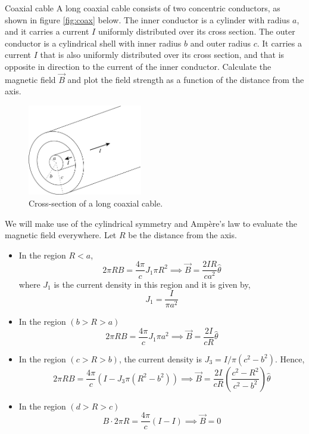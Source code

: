 \documentclass[makesolutionspdf]{esg8022pset}
\begin{document}
\begin{problem}{Coaxial cable}
  A long coaxial cable consists of two concentric conductors, as shown in figure
  \autoref{fig:coax} below.  The inner conductor is a cylinder with radius $a$,
  and it carries a current $I$ uniformly distributed over its cross section.
  The outer conductor is a cylindrical shell with inner radius $b$ and outer
  radius $c$. It carries a current $I$ that is also uniformly distributed over
  its cross section, and that is opposite in direction to the current of the
  inner conductor.  Calculate the magnetic field $\vec{B}$  and plot the field
  strength as a function of the distance from the axis.
  \begin{figure}[H]
    \centering
    \includegraphics[width = 5cm]{coax}
    \caption{Cross-section of a long coaxial cable.}   
    \label{fig:coax}
  \end{figure}
\end{problem}

\begin{solution}
  We will make use of the cylindrical symmetry and Amp\`{e}re's law to evaluate the magnetic field everywhere. 
  Let $R$ be the distance from the axis.
  \begin{itemize}
    \item In the region $R<a$,
      $$2\pi R B = \frac{4\pi}{c} J_1\pi R^2 \implies \vec{B} = \frac{2IR}{ca^2}\hat{\theta}$$
      where $J_1$ is the current density in this region and it is given by,
      $$J_{1} = \frac{I}{\pi a^{2}}$$
    \item
      In the region $(b > R > a)$ $$  2\pi R B = \frac{4\pi}{c} J_1\pi a^2
      \implies \vec{B} = \frac{2I}{cR}\hat{\theta}$$
    \item
      In the region $(c > R > b)$, the current density is $J_{3} = I/\pi ( c^2 - b^2 )$. Hence,
      $$2\pi R B = \frac{4\pi}{c} ( I  -
      J_3\pi(R^2-b^2)) \implies \vec{B} =
      \frac{2I}{cR}\left(\frac{c^2 - R^2}{c^2 -b^2}\right)\hat{\theta}$$
    \item
      In the region $(d > R > c)$ $$ B\cdot 2\pi R = \frac{4\pi}{c} ( I - I) \implies \vec{B} = 0 $$
  \end{itemize}
\end{solution}
\end{document}
